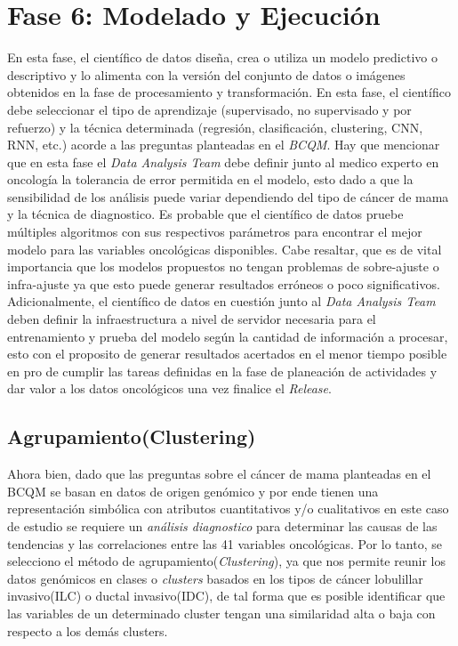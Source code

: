 \clearpage
\section{Fase 6: Modelado y Ejecución}
En esta fase, el científico de datos diseña, crea o utiliza un modelo predictivo o descriptivo y lo alimenta con la versión del conjunto de datos o imágenes obtenidos en la fase de procesamiento y transformación. En esta fase, el científico debe seleccionar el tipo de aprendizaje (supervisado, no supervisado y por refuerzo) y la técnica determinada (regresión, clasificación, clustering, CNN, RNN, etc.) acorde a las preguntas planteadas en el \textit{BCQM}. Hay que mencionar que en esta fase el \textit{Data Analysis Team} debe definir junto al medico experto en oncología la tolerancia de error permitida en el modelo, esto dado a que la sensibilidad de los análisis puede variar dependiendo del tipo de cáncer de mama y la técnica de diagnostico. Es probable que el científico de datos pruebe múltiples algoritmos con sus respectivos parámetros para encontrar el mejor modelo para las variables oncológicas disponibles. Cabe resaltar, que es de vital importancia que los modelos propuestos no tengan problemas de sobre-ajuste o infra-ajuste ya que esto puede generar resultados erróneos o poco significativos. Adicionalmente, el científico de datos en cuestión junto al \textit{Data Analysis Team} deben definir la infraestructura a nivel de servidor necesaria para el entrenamiento y prueba del modelo según la cantidad de información a procesar, esto con el proposito de generar resultados acertados en el menor tiempo posible en pro de cumplir las tareas definidas en la fase de planeación de actividades y dar valor a los datos oncológicos una vez finalice el \textit{Release}.

\subsection{Agrupamiento(Clustering)}
Ahora bien, dado que las preguntas sobre el cáncer de mama planteadas en el BCQM se basan en datos de origen genómico y por ende tienen una representación simbólica con atributos cuantitativos y/o cualitativos en este caso de estudio se requiere un \textit{análisis diagnostico} para determinar las causas de las tendencias y las correlaciones entre las 41 variables oncológicas. Por lo tanto, se selecciono el  método de agrupamiento(\textit{Clustering}), ya que nos permite reunir los datos genómicos en clases o \textit{clusters} basados en los tipos de cáncer lobulillar invasivo(ILC) o ductal invasivo(IDC), de tal forma que es posible identificar que las variables de un determinado cluster tengan una similaridad alta o baja con respecto a los demás clusters.

